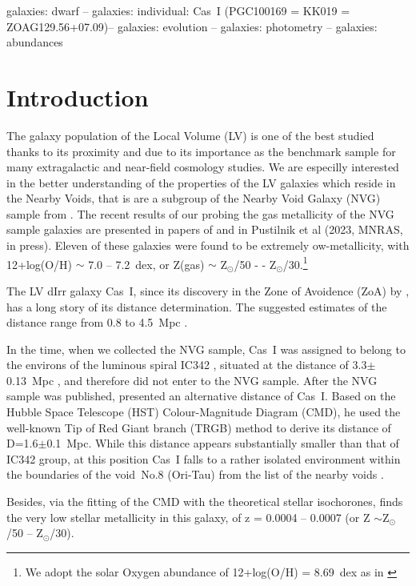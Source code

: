 \documentclass[useAMS,usenatbib]{mn2e}
\newcommand{\sunn}{$_{\odot}$}
\begin{document}
\begin{keywords}
galaxies: dwarf -- galaxies: individual: Cas~I (PGC100169 = KK019 = ZOAG129.56+07.09)-- galaxies: evolution
-- galaxies: photometry --  galaxies: abundances
\end{keywords}

\section[]{Introduction}
\label{sec:intro}
\setcounter{figure}{0}

The galaxy population of the Local Volume (LV) is one of the best studied thanks to its proximity
and due to its importance as the benchmark sample for many extragalactic and near-field cosmology studies.
We are especilly interested in the better understanding of the properties of the LV galaxies
which reside in the Nearby Voids, that is are a subgroup of the Nearby Void Galaxy (NVG)
sample from \citet{PTM19}. The recent results of our probing the gas metallicity
of the NVG sample galaxies are presented in papers of \citet{XMP-SALT, XMP-BTA} and
in Pustilnik et al (2023, MNRAS, in press). Eleven of these galaxies were found to be extremely 
ow-metallicity, with 12+log(O/H) $\sim$ 7.0 -- 7.2~dex, or Z(gas) $\sim$ Z\sunn/50 -
- Z\sunn/30.\footnote{We adopt the solar Oxygen abundance of 12+log(O/H) = 8.69~dex as in \citet{Asplund2009}}

The LV dIrr galaxy Cas~I, since its discovery in the Zone of Avoidence (ZoA)
by \citet{Weinberger95}, has a long story of its distance determination.
The suggested estimates of the distance range from 0.8 to 4.5~Mpc
\citep{Tikhonov96,Karachentsev97,WS1998,UNGC,Tikhonov19,Anand21}.

In the time, when we collected  the NVG sample, Cas~I was assigned to
belong to the environs of the luminous spiral IC342 \citep{UNGC}, situated at the distance
of 3.3$\pm$0.13~Mpc \citep{Anand21}, and therefore did not enter to the NVG sample.
After the NVG sample was published, \citet{Tikhonov19} presented an alternative distance of Cas~I.
Based on the Hubble Space Telescope (HST) Colour-Magnitude Diagram (CMD), he used the
well-known Tip of Red Giant branch (TRGB) method to derive its distance of D=1.6$\pm$0.1~Mpc.
While this distance appears substantially smaller than that of IC342 group, at this position
Cas~I falls to a rather isolated environment within the boundaries of the void~No.8 (Ori-Tau)
from the list of the nearby voids \citep{PTM19}.

Besides, via the fitting of the CMD with the theoretical stellar isochorones,
\citet{Tikhonov19} finds the very low stellar metallicity in this galaxy, of z = 0.0004 -- 0.0007
(or Z $\sim$Z\sunn/50 -- Z\sunn/30).
\end{document}
